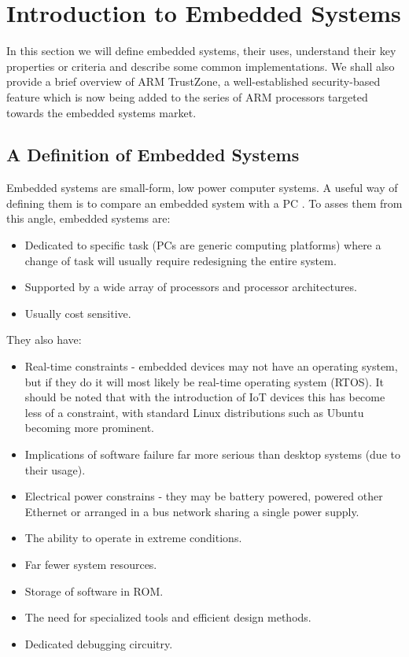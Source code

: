 \section{Introduction to Embedded Systems}

In this section we will define embedded systems, their uses, understand their key properties or criteria and describe some common implementations. We shall also provide a brief overview of ARM TrustZone, a well-established security-based feature which is now being added to the series of ARM processors targeted towards the embedded systems market.

\subsection{A Definition of Embedded Systems}

Embedded systems are small-form, low power computer systems. A useful way of defining them is to compare an embedded system with a PC \cite{BergerArnold2002Esd:}. To asses them from this angle, embedded systems are:
\begin{itemize}
\item Dedicated to specific task (PCs are generic computing platforms) where a change of task will usually require redesigning the entire system.
\item Supported by a wide array of processors and processor architectures.
\item Usually cost sensitive.
\end{itemize}
They also have:
\begin{itemize}
\item Real-time constraints - embedded devices may not have an operating system, but if they do it will most likely be real-time operating system (RTOS). It should be noted that with the introduction of IoT devices this has become less of a constraint, with standard Linux distributions such as Ubuntu becoming more prominent.
\item Implications of software failure far more serious than desktop systems (due to their usage).
\item Electrical power constrains - they may be battery powered, powered other Ethernet or arranged in a bus network sharing a single power supply.
\item The ability to operate in extreme conditions.
\item Far fewer system resources.
\item Storage of software in ROM.
\item The need for specialized tools and efficient design methods.
\item Dedicated debugging circuitry.
\end{itemize}


